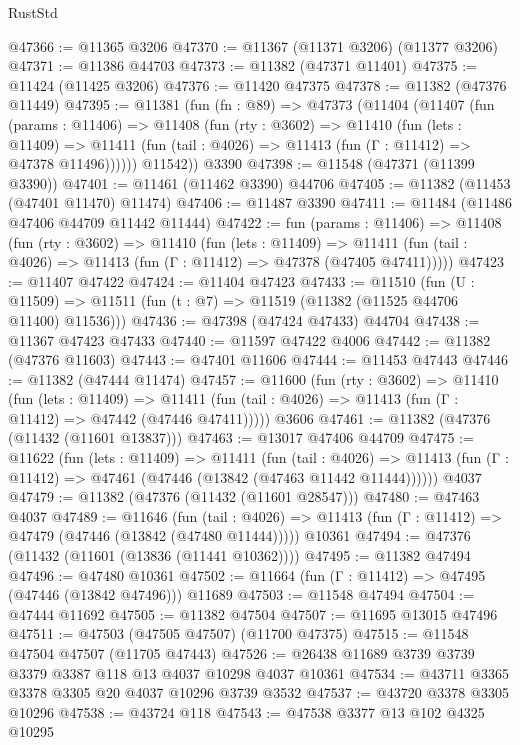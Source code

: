 \begin{lexlean}{RustStd}
\begin{coremodule}
@47366 := @11365 @3206
@47370 := @11367 (@11371 @3206) (@11377 @3206)
@47371 := @11386 @44703
@47373 := @11382 (@47371 @11401)
@47375 := @11424 (@11425 @3206)
@47376 := @11420 @47375
@47378 := @11382 (@47376 @11449)
@47395 := @11381
    (fun (fn : @89) =>
    @47373
      (@11404
        (@11407
          (fun (params : @11406) =>
          @11408
            (fun (rty : @3602) =>
            @11410
              (fun (lets : @11409) =>
              @11411 (fun (tail : @4026) => @11413 (fun (Γ : @11412) => @47378 @11496))))))
        @11542))
    @3390
@47398 := @11548 (@47371 (@11399 @3390))
@47401 := @11461 (@11462 @3390) @44706
@47405 := @11382 (@11453 (@47401 @11470) @11474)
@47406 := @11487 @3390
@47411 := @11484 (@11486 @47406 @44709 @11442 @11444)
@47422 := fun (params : @11406) =>
  @11408
    (fun (rty : @3602) =>
    @11410
      (fun (lets : @11409) =>
      @11411 (fun (tail : @4026) => @11413 (fun (Γ : @11412) => @47378 (@47405 @47411)))))
@47423 := @11407 @47422
@47424 := @11404 @47423
@47433 := @11510
    (fun (U : @11509) => @11511 (fun (t : @7) => @11519 (@11382 (@11525 @44706 @11400) @11536)))
@47436 := @47398 (@47424 @47433) @44704
@47438 := @11367 @47423 @47433
@47440 := @11597 @47422 @4006
@47442 := @11382 (@47376 @11603)
@47443 := @47401 @11606
@47444 := @11453 @47443
@47446 := @11382 (@47444 @11474)
@47457 := @11600
    (fun (rty : @3602) =>
    @11410
      (fun (lets : @11409) =>
      @11411 (fun (tail : @4026) => @11413 (fun (Γ : @11412) => @47442 (@47446 @47411)))))
    @3606
@47461 := @11382 (@47376 (@11432 (@11601 @13837)))
@47463 := @13017 @47406 @44709
@47475 := @11622
    (fun (lets : @11409) =>
    @11411
      (fun (tail : @4026) =>
      @11413 (fun (Γ : @11412) => @47461 (@47446 (@13842 (@47463 @11442 @11444))))))
    @4037
@47479 := @11382 (@47376 (@11432 (@11601 @28547)))
@47480 := @47463 @4037
@47489 := @11646
    (fun (tail : @4026) => @11413 (fun (Γ : @11412) => @47479 (@47446 (@13842 (@47480 @11444)))))
    @10361
@47494 := @47376 (@11432 (@11601 (@13836 (@11441 @10362))))
@47495 := @11382 @47494
@47496 := @47480 @10361
@47502 := @11664 (fun (Γ : @11412) => @47495 (@47446 (@13842 @47496))) @11689
@47503 := @11548 @47494
@47504 := @47444 @11692
@47505 := @11382 @47504
@47507 := @11695 @13015 @47496
@47511 := @47503 (@47505 @47507) (@11700 @47375)
@47515 := @11548 @47504 @47507 (@11705 @47443)
@47526 := @26438 @11689 @3739 @3739 @3379 @3387 @118 @13 @4037 @10298 @4037 @10361
@47534 := @43711 @3365 @3378 @3305 @20 @4037 @10296 @3739 @3532
@47537 := @43720 @3378 @3305 @10296
@47538 := @43724 @118
@47543 := @47538 @3377 @13 @102 @4325 @10295

\end{coremodule}
\end{lexlean}

